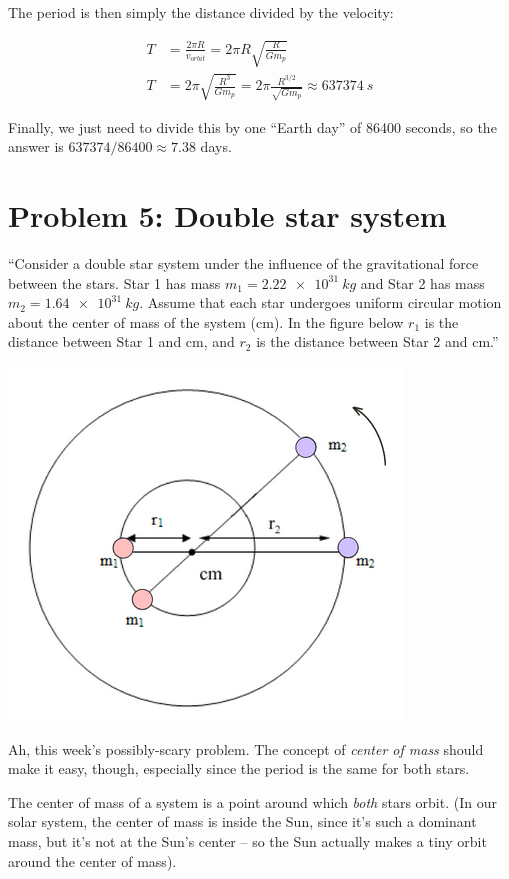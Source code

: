 \documentclass[12pt,a4paper]{report}
\begin{document}
The period is then simply the distance divided by the velocity:

\begin{align}
T &= \frac{2 \pi R}{v_{orbit}} = 2 \pi R \sqrt{\frac{R}{G m_p}}\\
T &= 2 \pi \sqrt{\frac{R^3}{G m_p}} = 2 \pi \frac{R^{3/2}}{\sqrt{G m_p}} \approx \SI{637374}{s}
\end{align}

Finally, we just need to divide this by one ``Earth day'' of 86400 seconds, so the answer is $637374/86400 \approx 7.38$ days.

\section{Problem 5: Double star system}

``Consider a double star system under the influence of the gravitational force between the stars. Star 1 has mass $m_1 = \SI{2.22e31}{kg}$ and Star 2 has mass $m_2 = \SI{1.64e31}{kg}$. Assume that each star undergoes uniform circular motion about the center of mass of the system (cm). In the figure below $r_1$ is the distance between Star 1 and cm, and $r_2$ is the distance between Star 2 and cm.''

\begin{center}
\includegraphics[scale=0.65]{Graphics/h5p5}
\end{center}

Ah, this week's possibly-scary problem. The concept of \emph{center of mass} should make it easy, though, especially since the period is the same for both stars.

The center of mass of a system is a point around which \emph{both} stars orbit. (In our solar system, the center of mass is inside the Sun, since it's such a dominant mass, but it's not at the Sun's center -- so the Sun actually makes a tiny orbit around the center of mass).
\end{document}
